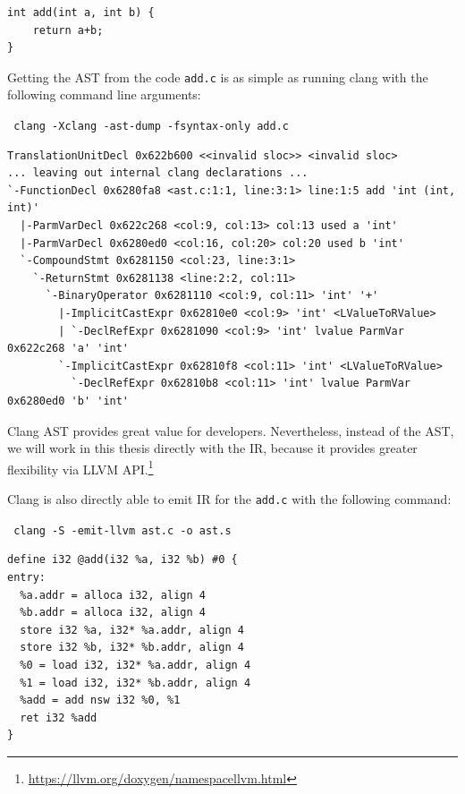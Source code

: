 \documentclass[12pt, twoside]{fithesis2}
\renewcommand{\_}{\leavevmode \kern0.07em\vbox{\hrule width0.4em}}
\begin{document}
\begin{verbatim}
int add(int a, int b) {
    return a+b;
}
\end{verbatim}

Getting the AST from the code \texttt{add.c} is as simple as running
clang with the following command line arguments:

\texttt{
clang -Xclang -ast-dump -fsyntax-only add.c
}

\begin{verbatim}
TranslationUnitDecl 0x622b600 <<invalid sloc>> <invalid sloc>
... leaving out internal clang declarations ...
`-FunctionDecl 0x6280fa8 <ast.c:1:1, line:3:1> line:1:5 add 'int (int, int)'
  |-ParmVarDecl 0x622c268 <col:9, col:13> col:13 used a 'int'
  |-ParmVarDecl 0x6280ed0 <col:16, col:20> col:20 used b 'int'
  `-CompoundStmt 0x6281150 <col:23, line:3:1>
    `-ReturnStmt 0x6281138 <line:2:2, col:11>
      `-BinaryOperator 0x6281110 <col:9, col:11> 'int' '+'
        |-ImplicitCastExpr 0x62810e0 <col:9> 'int' <LValueToRValue>
        | `-DeclRefExpr 0x6281090 <col:9> 'int' lvalue ParmVar 0x622c268 'a' 'int'
        `-ImplicitCastExpr 0x62810f8 <col:11> 'int' <LValueToRValue>
          `-DeclRefExpr 0x62810b8 <col:11> 'int' lvalue ParmVar 0x6280ed0 'b' 'int'
\end{verbatim}

Clang AST provides great value for developers. Nevertheless, instead of the
AST, we will work in this thesis directly with the IR, because it provides
greater flexibility via LLVM API.\footnote{
\url{https://llvm.org/doxygen/namespacellvm.html}
}

Clang is also directly able to emit IR for the \texttt{add.c} with
the following command:

\texttt{
clang -S -emit-llvm ast.c -o ast.s
}

\begin{verbatim}
define i32 @add(i32 %a, i32 %b) #0 {
entry:
  %a.addr = alloca i32, align 4
  %b.addr = alloca i32, align 4
  store i32 %a, i32* %a.addr, align 4
  store i32 %b, i32* %b.addr, align 4
  %0 = load i32, i32* %a.addr, align 4
  %1 = load i32, i32* %b.addr, align 4
  %add = add nsw i32 %0, %1
  ret i32 %add
}
\end{verbatim}


\end{document}
